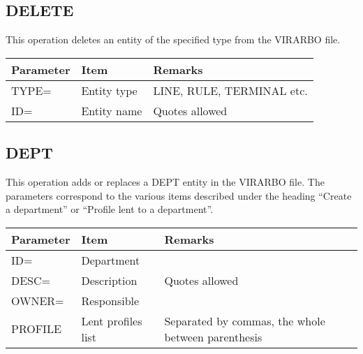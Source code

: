 \documentclass[letterpaper,10pt,english]{sphinxmanual}
\begin{document}
\ignorespaces 

\subsection{DELETE}
\label{\detokenize{Installation_Guide:delete}}\label{\detokenize{Installation_Guide:index-161}}
This operation deletes an entity of the specified type from the VIRARBO file.


\begin{savenotes}\sphinxattablestart
\centering
\begin{tabulary}{\linewidth}[t]{|T|T|T|}
\hline
\sphinxstyletheadfamily 
Parameter
&\sphinxstyletheadfamily 
Item
&\sphinxstyletheadfamily 
Remarks
\\
\hline
TYPE=
&
Entity type
&
LINE, RULE, TERMINAL etc.
\\
\hline
ID=
&
Entity name
&
Quotes allowed
\\
\hline
\end{tabulary}
\par
\sphinxattableend\end{savenotes}

\ignorespaces 

\subsection{DEPT}
\label{\detokenize{Installation_Guide:dept}}\label{\detokenize{Installation_Guide:index-162}}
This operation adds or replaces a DEPT entity in the VIRARBO file. The parameters correspond to the various items
described under the heading “Create a department” or “Profile lent to a department”.


\begin{savenotes}\sphinxattablestart
\centering
\begin{tabulary}{\linewidth}[t]{|T|T|T|}
\hline
\sphinxstyletheadfamily 
Parameter
&\sphinxstyletheadfamily 
Item
&\sphinxstyletheadfamily 
Remarks
\\
\hline
ID=
&
Department
&\\
\hline
DESC=
&
Description
&
Quotes allowed
\\
\hline
OWNER=
&
Responsible
&\\
\hline
PROFILE
&
Lent profiles list
&
Separated by commas, the whole between parenthesis
\\
\hline
\end{tabulary}
\par
\sphinxattableend\end{savenotes}
\end{document}
